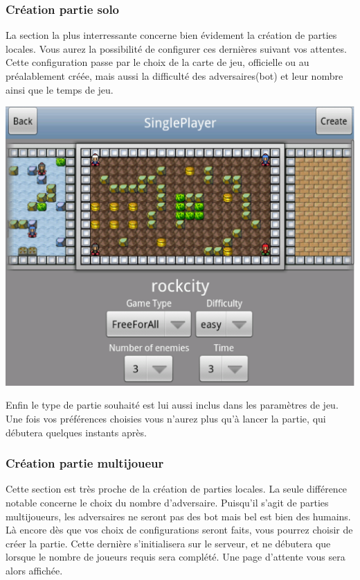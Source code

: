 	\subsubsection{Création partie solo}
	La section la plus interressante concerne bien évidement la création de parties
	locales. Vous aurez la possibilité de configurer ces dernières suivant vos
	attentes. Cette configuration passe par le choix de la carte de jeu, officielle
	ou au préalablement créée, mais aussi la difficulté des adversaires(\gls{bot})
	et leur nombre ainsi que le temps de jeu.
		\begin{center}						
			\includegraphics[scale=0.4]{Developpement/Img/7.eps}
		\end{center} 
	Enfin le type de partie souhaité est lui
	aussi inclus dans les paramètres de jeu. Une fois vos préférences choisies
	vous n'aurez plus qu'à lancer la partie, qui débutera quelques instants après.
	
	
	\subsubsection{Création partie multijoueur}
	Cette section est très proche de la création de parties locales. La seule
	différence notable concerne le choix du nombre d'adversaire. Puisqu'il s'agit
	de parties multijoueurs, les adversaires ne seront pas des \gls{bot} mais bel
	est bien des humains. 
	Là encore dès que vos choix de configurations seront faits, vous pourrez
	choisir de créer la partie. Cette dernière s'initialisera sur le serveur, et ne
	débutera que lorsque le nombre de joueurs requis sera complété. Une page
	d'attente vous sera alors affichée.
	
